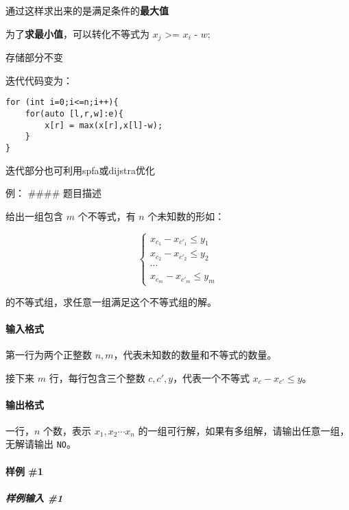 \documentclass[]{article}
\let\oldparagraph\paragraph
\renewcommand{\paragraph}[1]{\oldparagraph{#1}\mbox{}}
\let\oldsubparagraph\subparagraph
\renewcommand{\subparagraph}[1]{\oldsubparagraph{#1}\mbox{}}
\begin{document}
通过这样求出来的是满足条件的\textbf{最大值}

为了\textbf{求最小值}，可以转化不等式为 \(x_j\) \textgreater{}= \(x_i\)
- \(w\);

存储部分不变

迭代代码变为：

\begin{verbatim}
for (int i=0;i<=n;i++){
    for(auto [l,r,w]:e){
        x[r] = max(x[r],x[l]-w);
    }
}
\end{verbatim}

迭代部分也可利用spfa或dijstra优化

例： \#\#\#\# 题目描述

给出一组包含 \(m\) 个不等式，有 \(n\) 个未知数的形如：

\[ \begin{cases} x_{c_1}-x_{c'_1}\leq y_1 \\x_{c_2}-x_{c'_2} \leq y_2 \\ \cdots\\ x_{c_m} - x_{c'_m}\leq y_m\end{cases}\]

的不等式组，求任意一组满足这个不等式组的解。

\hypertarget{ux8f93ux5165ux683cux5f0f}{%
\paragraph{输入格式}\label{ux8f93ux5165ux683cux5f0f}}

第一行为两个正整数 \(n,m\)，代表未知数的数量和不等式的数量。

接下来 \(m\) 行，每行包含三个整数 \(c,c',y\)，代表一个不等式
\(x_c-x_{c'}\leq y\)。

\hypertarget{ux8f93ux51faux683cux5f0f}{%
\paragraph{输出格式}\label{ux8f93ux51faux683cux5f0f}}

一行，\(n\) 个数，表示 \(x_1 , x_2 \cdots x_n\)
的一组可行解，如果有多组解，请输出任意一组，无解请输出 \texttt{NO}。

\hypertarget{ux6837ux4f8b-1}{%
\paragraph{样例 \#1}\label{ux6837ux4f8b-1}}

\hypertarget{ux6837ux4f8bux8f93ux5165-1}{%
\subparagraph{样例输入 \#1}\label{ux6837ux4f8bux8f93ux5165-1}}
\end{document}
